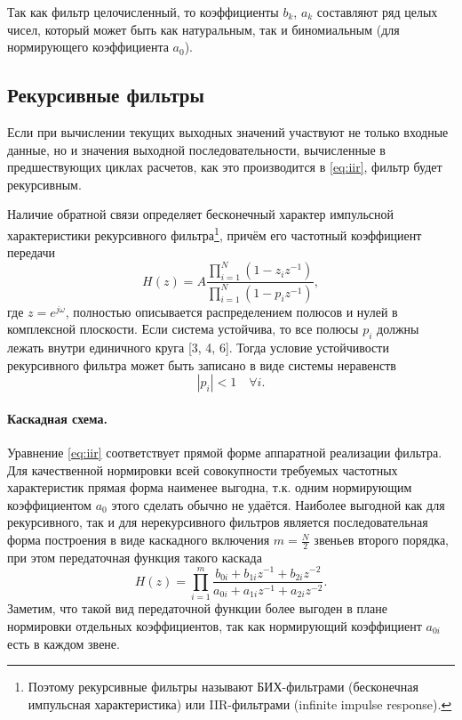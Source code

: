 Так как фильтр целочисленный, то коэффициенты $b_k$, $a_k$ составляют ряд целых чисел, который может быть как натуральным, так и биномиальным (для нормирующего коэффициента $a_0$).

\subsection{Рекурсивные фильтры} Если при вычислении текущих выходных значений участвуют не только входные данные, но и значения выходной последовательности, вычисленные в предшествующих циклах расчетов, как это производится в \eqref{eq:iir}, фильтр будет рекурсивным. 

Наличие обратной связи определяет бесконечный характер импульсной характеристики рекурсивного фильтра\footnote{Поэтому рекурсивные фильтры называют БИХ-фильтрами (бесконечная импульсная характеристика) или IIR-фильтрами (infinite impulse response).}, причём его частотный коэффициент передачи
\begin{equation}
  H\left(z\right)=A \frac{\prod_{i=1}^{N}\left(1-z_{i} z^{-1}\right)}{\prod_{i=1}^{N}\left(1-p_{i} z^{-1}\right)},
\end{equation}
где $z=e^{j \omega}$, полностью описывается распределением полюсов и нулей в комплексной плоскости. Если система устойчива, то все полюсы  $p_i$  должны лежать внутри единичного круга [3, 4, 6]. Тогда условие устойчивости рекурсивного фильтра может быть записано в виде системы неравенств
\begin{equation}
  |p_i|<1 \quad \forall i.
\end{equation}

\paragraph{Каскадная схема.} Уравнение \eqref{eq:iir} соответствует прямой форме аппаратной реализации фильтра. Для
качественной нормировки всей совокупности требуемых частотных характеристик прямая форма наименее выгодна, т.к. одним
нормирующим коэффициентом $a_0$ этого сделать обычно не удаётся. Наиболее выгодной как для рекурсивного, так и для
нерекурсивного фильтров является последовательная форма построения в виде каскадного включения $m=\frac{N}{2}$ звеньев
второго порядка, при этом передаточная функция такого каскада
\begin{equation}
  H(z)=\prod_{i=1}^{m} \frac{b_{0 i}+b_{1 i} z^{-1}+b_{2 i} z^{-2}}{a_{0 i}+a_{1 i} z^{-1}+a_{2 i} z^{-2}}.
  \label{eq:iir_cascad}
\end{equation}
Заметим, что такой вид передаточной функции более выгоден в плане нормировки отдельных коэффициентов, так как нормирующий коэффициент $a_{0i}$ есть в каждом звене. 

